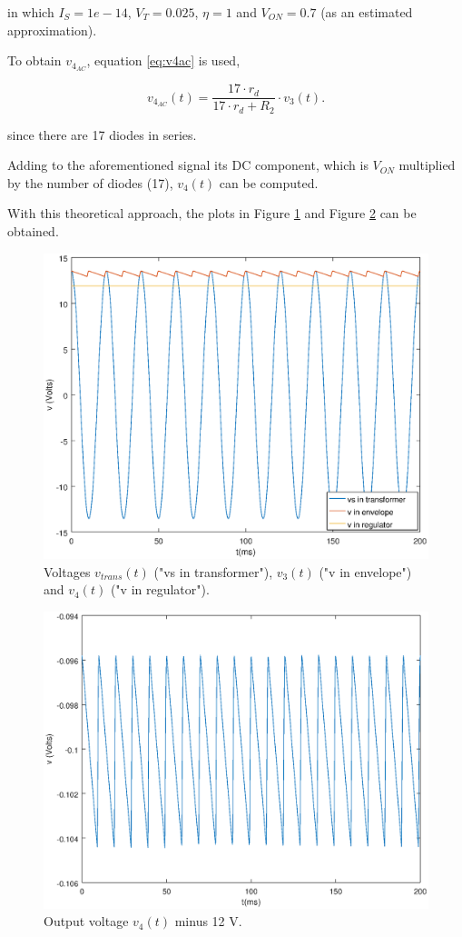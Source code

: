 in which $I_S=1e-14$, $V_T=0.025$, $\eta = 1$ and $V_{ON}=0.7$ (as an estimated approximation).

To obtain $v_{4_{AC}}$, equation \ref{eq:v4ac} is used,

\begin{equation}
    v_{4_{AC}}(t) = \frac{17 \cdot r_d}{17 \cdot r_d + R_2} \cdot v_3(t).
    \label{eq:v4ac}
\end{equation}

since there are 17 diodes in series.

Adding to the aforementioned signal its DC component, which is $V_{ON}$ multiplied by the number of diodes (17), $v_4(t)$ can be computed.

With this theoretical approach, the plots in Figure \ref{plot:todas} and Figure \ref{plot:diferenca} can be obtained. 


\begin{figure}[h]
\centering
\includegraphics[width=0.6\linewidth]{V_todas.eps}
\caption{Voltages $v_{trans}(t)$ ("vs in transformer"), $v_3(t)$ ("v in envelope") and $v_4(t)$ ("v in regulator").}
\label{plot:todas}
\end{figure}

\begin{figure}[h]
\centering
\includegraphics[width=0.6\linewidth]{diferenca.eps}
\caption{Output voltage $v_4(t)$ minus 12 V.}
\label{plot:diferenca}
\end{figure}


